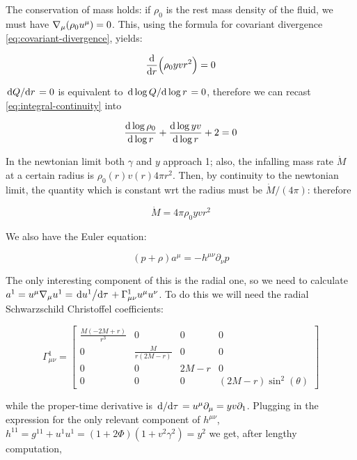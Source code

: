 \documentclass[main.tex]{subfiles}
\begin{document}
The conservation of mass holds: if $\rho_0$ is the rest mass density of the fluid, we must have $\nabla_\mu \qty(\rho_0 u^\mu) =0$. This, using the formula for covariant divergence \eqref{eq:covariant-divergence}, yields:

\begin{equation} \label{eq:integral-continuity}
    \dv{}{r} \qty(\rho_0 yvr^2) = 0
\end{equation}

\(\dv*{Q}{r} = 0\) is equivalent to \(\dv*{\log Q }{\log r} = 0 \), therefore we can recast \eqref{eq:integral-continuity} into

\begin{equation} \label{eq:differential-continuity}
  \dv{\log \rho_0}{\log r} +
  \dv{\log yv}{\log r} + 2 = 0
\end{equation}

In the newtonian limit both $\gamma$ and $y$ approach 1; also, the infalling mass rate $\Dot{M}$ at a certain radius is $\rho_0 (r) v(r) 4\pi r^2$. Then, by continuity to the newtonian limit, the quantity which is constant wrt the radius must be $\Dot{M} / (4\pi)$: therefore

\begin{equation}
  \dot{M} = 4 \pi\rho_0 yvr^2
\end{equation}

We also have the Euler equation:

\begin{equation} \label{eq:relativistic-euler}
    (p+\rho) a^\mu = - h^{\mu \nu} \partial_\nu p
\end{equation}

The only interesting component of this is the radial one, so we need to calculate \(a^1 = u^\mu \nabla_\mu u^1 = \dv*{u^1}{\tau} + \Gamma^1_{\mu \nu} u^\mu u^\nu \). To do this we will need the radial Schwarzschild Christoffel coefficients:

\begin{equation}
  \Gamma^1_{\mu \nu} = \left[\begin{matrix}\frac{M \left(- 2 M + r\right)}{r^{3}} & 0 & 0 & 0\\0 & \frac{M}{r \left(2 M - r\right)} & 0 & 0\\0 & 0 & 2 M - r & 0\\0 & 0 & 0 & \left(2 M - r\right) \sin^{2}{\left(\theta \right)}\end{matrix}\right]
\end{equation}

while the proper-time derivative is \(\dv*{}{\tau} = u^\mu \partial_\mu = yv\partial_1\).
Plugging in the expression for the only relevant component of \(h^{\mu\nu}\), \(h^{11} = g^{11} + u^1 u^1 = (1 + 2 \Phi) (1 + v^2 \gamma^2) = y^2\)
we get, after lengthy computation,
\end{document}
